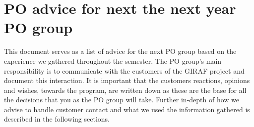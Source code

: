 \section{PO advice for next the next year PO group} \label{appendix:PO-advise}

This document serves as a list of advice for the next PO group based on the experience we gathered throughout the semester.
The PO group's main responsibility is to communicate with the customers of the GIRAF project and document this interaction.
It is important that the customers reactions, opinions and wishes, towards the program, are written down as these are the base for all the decisions that you as the PO group will take.
Further in-depth of how we advise to handle customer contact and what we used the information gathered is described in the following sections.

